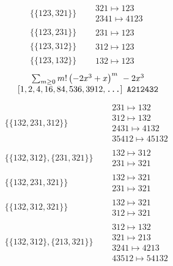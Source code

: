 \begin{tiny}
\begin{align}
\\
\{\{123, 321\}\}
\quad
&
\begin{matrix}
321 \mapsto 123\\2341 \mapsto 4123
\end{matrix}
\\
\{\{123, 231\}\}
\quad
&
\begin{matrix}
231 \mapsto 123
\end{matrix}
\\
\{\{123, 312\}\}
\quad
&
\begin{matrix}
312 \mapsto 123
\end{matrix}
\\
\{\{123, 132\}\}
\quad
&
\begin{matrix}
132 \mapsto 123
\end{matrix}
\end{align}
$$
\begin{matrix}
\sum_{m \geq 0} m! \left(
-2 x^{3} + x
\right)^m
\ 
-2 x^{3}
\\
\left[1, 2, 4, 16, 84, 536, 3912, \text{\texttt{...}}\right]
\ 
\texttt{A212432}
\end{matrix}
$$
\vspace{-1em}
\begin{align}
\{\{132, 231, 312\}\}
\quad
&
\begin{matrix}
231 \mapsto 132\\312 \mapsto 132\\2431 \mapsto 4132\\35412 \mapsto 45132
\end{matrix}
\\
\{\{132, 312\}, \{231, 321\}\}
\quad
&
\begin{matrix}
132 \mapsto 312\\231 \mapsto 321
\end{matrix}
\\
\{\{132, 231, 321\}\}
\quad
&
\begin{matrix}
132 \mapsto 321\\231 \mapsto 321
\end{matrix}
\\
\{\{132, 312, 321\}\}
\quad
&
\begin{matrix}
132 \mapsto 321\\312 \mapsto 321
\end{matrix}
\\
\{\{132, 312\}, \{213, 321\}\}
\quad
&
\begin{matrix}
312 \mapsto 132\\321 \mapsto 213\\3241 \mapsto 4213\\43512 \mapsto 54132

\end{matrix}
\end{align}
\end{tiny}
